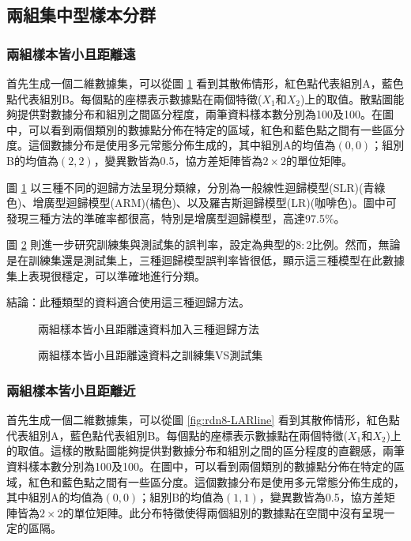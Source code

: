\subsection{兩組集中型樣本分群}
\subsubsection{兩組樣本皆小且距離遠}

首先生成一個二維數據集，可以從圖 \ref{fig:rdn7-LARline} 看到其散佈情形，紅色點代表組別A，藍色點代表組別B。每個點的座標表示數據點在兩個特徵($X_1$和$X_2$)上的取值。散點圖能夠提供對數據分布和組別之間區分程度，兩筆資料樣本數分別為100及100。在圖中，可以看到兩個類別的數據點分佈在特定的區域，紅色和藍色點之間有一些區分度。這個數據分布是使用多元常態分佈生成的，其中組別A的均值為$(0, 0)$；組別B的均值為$(2, 2)$，變異數皆為0.5，協方差矩陣皆為$2 \times 2$的單位矩陣。

圖 \ref{fig:rdn7-LARline} 以三種不同的迴歸方法呈現分類線，分別為一般線性迴歸模型(SLR)(青綠色)、增廣型迴歸模型(ARM)(橘色)、以及羅吉斯迴歸模型(LR)(咖啡色)。圖中可發現三種方法的準確率都很高，特別是增廣型迴歸模型，高達97.5\%。

圖 \ref{fig:rdn7-LARline2} 則進一步研究訓練集與測試集的誤判率，設定為典型的$8:2$比例。然而，無論是在訓練集還是測試集上，三種迴歸模型誤判率皆很低，顯示這三種模型在此數據集上表現很穩定，可以準確地進行分類。

結論：此種類型的資料適合使用這三種迴歸方法。
\begin{figure}[H]
    \caption{兩組樣本皆小且距離遠資料加入三種迴歸方法}
    \label{fig:rdn7-LARline}
\end{figure}
\begin{figure}[h]
    \caption{兩組樣本皆小且距離遠資料之訓練集VS測試集}
    \label{fig:rdn7-LARline2}
\end{figure}
\subsubsection{兩組樣本皆小且距離近}

首先生成一個二維數據集，可以從圖 \ref{fig:rdn8-LARline} 看到其散佈情形，紅色點代表組別A，藍色點代表組別B。每個點的座標表示數據點在兩個特徵($X_1$和$X_2$)上的取值。這樣的散點圖能夠提供對數據分布和組別之間的區分程度的直觀感，兩筆資料樣本數分別為100及100。在圖中，可以看到兩個類別的數據點分佈在特定的區域，紅色和藍色點之間有一些區分度。這個數據分布是使用多元常態分佈生成的，其中組別A的均值為$(0, 0)$；組別B的均值為$(1, 1)$，變異數皆為0.5，協方差矩陣皆為$2 \times 2$的單位矩陣。此分布特徵使得兩個組別的數據點在空間中沒有呈現一定的區隔。

